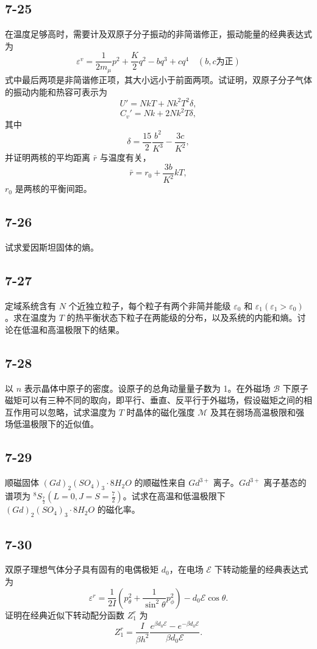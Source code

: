 \newpage
\subsection{7-25}
在温度足够高时，需要计及双原子分子振动的非简谐修正，振动能量的经典表达式为
$$\varepsilon^v = \frac{1}{2m_{\mu}} p^2 + \frac{K}{2} q^2 - bq^3 + cq^4 \quad (b,c 为正)$$
式中最后两项是非简谐修正项，其大小远小于前面两项。试证明，双原子分子气体的振动内能和热容可表示为
$$U' = NkT + Nk^2 T^2 \delta,$$
$$C_v' = Nk + 2Nk^2 T \delta,$$
其中
$$\delta = \frac{15}{2} \frac{b^2}{K^3} - \frac{3c}{K^2},$$
并证明两核的平均距离 $\bar{r}$ 与温度有关，
$$\bar{r} = r_0 + \frac{3b}{K^2}kT,$$
$r_0$ 是两核的平衡间距。

\newpage
\subsection{7-26}
试求爱因斯坦固体的熵。

\newpage
\subsection{7-27}
定域系统含有 $N$ 个近独立粒子，每个粒子有两个非简并能级 $\varepsilon_0$ 和 $\varepsilon_1 (\varepsilon_1 > \varepsilon_0)$。求在温度为 $T$ 的热平衡状态下粒子在两能级的分布，以及系统的内能和熵。讨论在低温和高温极限下的结果。

\newpage
\subsection{7-28}
以 $n$ 表示晶体中原子的密度。设原子的总角动量量子数为 1。在外磁场 $\mathscr{B}$ 下原子磁矩可以有三种不同的取向，即平行、垂直、反平行于外磁场，假设磁矩之间的相互作用可以忽略，试求温度为 $T$ 时晶体的磁化强度 $\mathscr{M}$ 及其在弱场高温极限和强场低温极限下的近似值。

\newpage
\subsection{7-29}
顺磁固体 $(Gd)_2 (SO_4)_3 \cdot 8H_2O$ 的顺磁性来自 $Gd^{3+}$ 离子。$Gd^{3+}$ 离子基态的谱项为 $^8S_{\frac{7}{2}} (L = 0, J = S = \frac{7}{2})$。试求在高温和低温极限下 $(Gd)_2 (SO_4)_3 \cdot 8H_2O$ 的磁化率。

\newpage
\subsection{7-30}
双原子理想气体分子具有固有的电偶极矩 $d_0$，在电场 $\mathscr{E}$ 下转动能量的经典表达式为
$$\varepsilon^r = \frac{1}{2I} \left( p_\theta^2 + \frac{1}{\sin^2 \theta} p_\phi^2 \right) - d_0 \mathscr{E} \cos \theta.$$
证明在经典近似下转动配分函数 $Z_1^r$ 为
$$Z_1^r = \frac{I}{\beta h^2} \frac{e^{\beta d_0 \mathscr{E}} - e^{-\beta d_0 \mathscr{E}}}{\beta d_0 \mathscr{E}}.$$